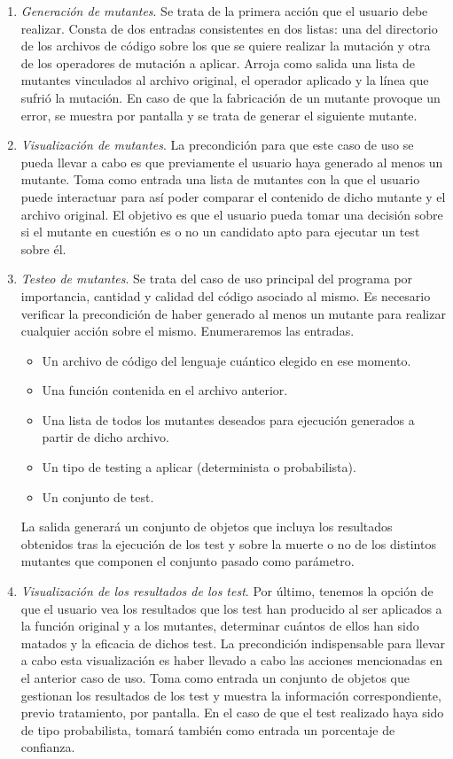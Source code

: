 \begin{enumerate}
\item \textit{Generación de mutantes}. Se trata de la primera acción que el usuario debe realizar. Consta de dos entradas consistentes en dos listas: una del directorio de los archivos de código sobre los que se quiere realizar la mutación y otra de los operadores de mutación a aplicar. Arroja como salida una lista de mutantes vinculados al archivo original, el operador aplicado y la línea que sufrió la mutación. En caso de que la fabricación de un mutante provoque un error, se muestra por pantalla y se trata de generar el siguiente mutante.

\item \textit{Visualización de mutantes}. La precondición para que este caso de uso se pueda llevar a cabo es que previamente el usuario haya generado al menos un mutante. Toma como entrada una lista de mutantes con la que el usuario puede interactuar para así poder comparar el contenido de dicho mutante y el archivo original. El objetivo es que el usuario pueda tomar una decisión sobre si el mutante en cuestión es o no un candidato apto para ejecutar un test sobre él.

\item \textit{Testeo de mutantes}. Se trata del caso de uso principal del programa por importancia, cantidad y calidad del código asociado al mismo. Es necesario verificar la precondición de haber generado al menos un mutante para realizar cualquier acción sobre el mismo. Enumeraremos las entradas.
	\begin{itemize}
	\item Un archivo de código del lenguaje cuántico elegido en ese momento.
	\item Una función contenida en el archivo anterior.
	\item Una lista de todos los mutantes deseados para ejecución generados a partir de dicho archivo.
	\item Un tipo de testing a aplicar (determinista o probabilista).
	\item Un conjunto de test.
	\end{itemize}
	
La salida generará un conjunto de objetos que incluya los resultados obtenidos tras la ejecución de los test y sobre la muerte o no de los distintos mutantes que componen el conjunto pasado como parámetro.

\item \textit{Visualización de los resultados de los test}. Por último, tenemos la opción de que el usuario vea los resultados que los test han producido al ser aplicados a la función original y a los mutantes, determinar cuántos de ellos han sido matados y la eficacia de dichos test. La precondición indispensable para llevar a cabo esta visualización es haber llevado a cabo las acciones mencionadas en el anterior caso de uso. Toma como entrada un conjunto de objetos que gestionan los resultados de los test y muestra la información correspondiente, previo tratamiento, por pantalla. En el caso de que el test realizado haya sido de tipo probabilista, tomará también como entrada un porcentaje de confianza.
\end{enumerate}

